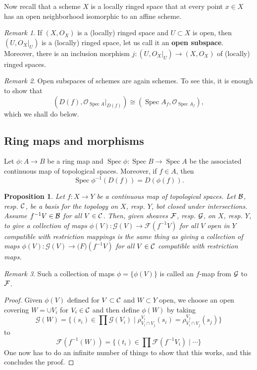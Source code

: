 \documentclass{article}
\newcommand{\OO}{\mathcal{O}}
\DeclareMathOperator{\Spec}{Spec}
\theoremstyle{plain}
\newtheorem*{prop*}{Proposition}
\theoremstyle{definition}
\theoremstyle{remark}
\newtheorem*{rem}{Remark}
\begin{document}
Now recall that a scheme $X$ is a locally ringed space that at every point $x\in X$ has an open neighborhood isomorphic to an affine scheme.

\begin{rem}
If $(X,O_X)$ is a (locally) ringed space and $U\subset X$ is open, then $(U,O_X|_U)$ is a (locally) ringed space, let us call it an \textbf{open subspace}. Moreover, there is an inclusion morphism
$j:(U,O_X|_U)\to (X,O_X)$ of (locally) ringed spaces.
\end{rem}

\begin{rem}
Open subspaces of schemes are again schemes. To see this, it is enough to show that
\[(D(f),\OO_{\Spec A}|_{D(f)})\cong (\Spec A_f,\OO_{\Spec A_f}),\]
which we shall do below.
\end{rem}

\subsection*{Ring maps and morphisms}

Let $\phi: A\to B$ be a ring map and $\Spec \phi:\Spec B\to \Spec A$ be the associated continuous map of topological spaces. Moreover, if $f\in A$, then
\[\Spec\phi^{-1}(D(f))=D(\phi(f)).\]

\begin{prop*}
Let $f:X\to Y$ be a continuous map of topological spaces. Let $\cal B$, resp. $\cal C$, be a basis for the topology on $X$, resp. $Y$, bot closed under intersections. Assume $f^{-1}V\in\cal B$ for all $V\in\cal C$. Then, given sheaves $\cal F$, resp. $\cal G$, on $X$, resp. $Y$, to give a collection of maps $\phi(V):\mathcal{G}(V)\to\mathcal{F}(f^{-1}V)$ for all $V$ open in $Y$ compatible with restriction mappings is the same thing as giving a collection of maps $\phi(V):\mathcal{G}(V)\to\mathcal(F)(f^{-1}V)$ for all $V\in \cal C$ compatible with restriction maps.
\end{prop*}
\begin{rem}
Such a collection of maps $\phi=\{\phi(V)\}$ is called an $f$-map from $\cal G$ to $\cal F$.
\end{rem}
\begin{proof}
Given $\phi(V)$ defined for $V\subset \cal C$ and $W\subset Y$ open, we choose an open covering $W=\cup V_i$ for $V_i\in\cal C$ and then define $\phi(W)$ by taking
\[\mathcal{G}(W)=\{(s_i)\in\prod \mathcal{G}(V_i)\mid \rho^{V_i}_{V_i\cap V_j}(s_i)=\rho^{V_j}_{V_i\cap V_j}(s_j)\}\]
to
\[\mathcal{F}(f^{-1}(W))=\{(t_i)\in\prod \mathcal{F}(f^{-1}V_i)\mid \cdots\}\]
One now has to do an infinite number of things to show that this works, and this concludes the proof.
\end{proof}
\end{document}
